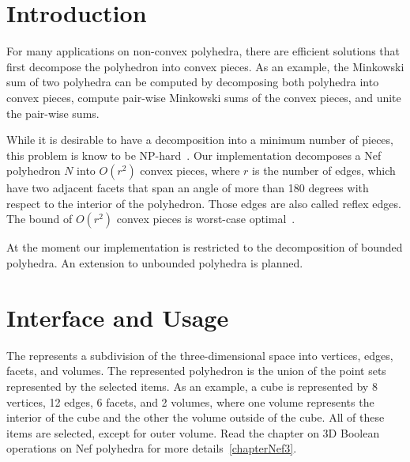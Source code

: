 
\ccParDims


%

\section{Introduction}

For many applications on non-convex polyhedra, there are efficient
solutions that first decompose the polyhedron into convex pieces. As
an example, the Minkowski sum of two polyhedra can be computed by
decomposing both polyhedra into convex pieces, compute pair-wise
Minkowski sums of the convex pieces, and unite the pair-wise sums.

While it is desirable to have a decomposition into a minimum number of
pieces, this problem is know to be NP-hard~\cite{c-cpplb-84}. Our
implementation decomposes a Nef polyhedron $N$ into $O(r^2)$ convex
pieces, where $r$ is the number of edges, which have two adjacent
facets that span an angle of more than 180 degrees with respect to the
interior of the polyhedron. Those edges are also called reflex edges.
The bound of $O(r^2)$ convex pieces is worst-case
optimal~\cite{c-cpplb-84}.

At the moment our implementation is restricted to the decomposition of
bounded polyhedra. An extension to unbounded polyhedra is planned.

\section{Interface and Usage}

The  represents a subdivision of the
three-dimensional space into vertices, edges, facets, and volumes. The
represented polyhedron is the union of the point sets represented by
the selected items. As an example, a cube is represented by 8
vertices, 12 edges, 6 facets, and 2 volumes, where one volume
represents the interior of the cube and the other the volume outside
of the cube. All of these items are selected, except for outer volume.
Read the chapter on 3D Boolean operations on Nef polyhedra for more
details~\ref{chapterNef3}.


